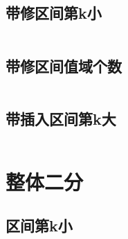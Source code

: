 \documentclass[a4paper,12pt]{article}
\begin{document}
\subsection*{带修区间第k小}
\inputminted[]{c++}{code/luoguP2617.cpp}
\subsection*{带修区间值域个数}
\inputminted[]{c++}{code/19ncI.cpp}
\subsection*{带插入区间第k大}
\inputminted[]{c++}{code/luoguP3332.cpp}
\section*{整体二分}
\subsection*{区间第k小}
\inputminted[]{c++}{code/luoguP3834.cpp}
\newpage





\end{document}
